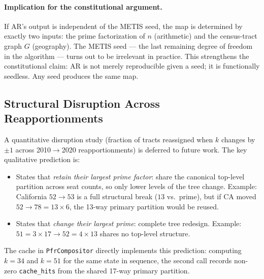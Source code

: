 \paragraph{Implication for the constitutional argument.}
If AR's output is independent of the METIS seed, the map is determined by
exactly two inputs: the prime factorization of $n$ (arithmetic) and the
census-tract graph $G$ (geography). The METIS seed --- the last remaining
degree of freedom in the algorithm --- turns out to be irrelevant in practice.
This strengthens the constitutional claim: AR is not merely reproducible given
a seed; it is functionally seedless. Any seed produces the same map.

\subsection{Structural Disruption Across Reapportionments}
\label{sec:eval:disruption}

A quantitative disruption study (fraction of tracts reassigned when $k$ changes
by $\pm 1$ across 2010$\to$2020 reapportionments) is deferred to future work.
The key qualitative prediction is:

\begin{itemize}
  \item States that \emph{retain their largest prime factor}: share the canonical
        top-level partition across seat counts, so only lower levels of the tree
        change. Example: California $52 \to 53$ is a full structural break ($13$
        vs.\ prime), but if CA moved $52 \to 78 = 13 \times 6$, the 13-way
        primary partition would be reused.
  \item States that \emph{change their largest prime}: complete tree redesign.
        Example: $51 = 3 \times 17 \to 52 = 4 \times 13$ shares no top-level
        structure.
\end{itemize}

The cache in \texttt{PfrCompositor} directly implements this prediction:
computing $k=34$ and $k=51$ for the same state in sequence, the second call
records non-zero \texttt{cache\_hits} from the shared 17-way primary partition.
